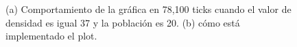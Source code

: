 \begin{enumerate}
\begin{itemize}
\begin{figure}[H]
\begin{tabular}{ccccc}
    \end{tabular}
    \vspace{-10pt}
    \caption{(a) Comportamiento de la gráfica en 78,100 ticks cuando el valor de densidad es igual 37 y la población es 20. (b) cómo está implementado el plot.}
    \label{fig:002}
	\end{figure}
		
		
		
	
	\end{itemize}
	
	
	

\end{enumerate}